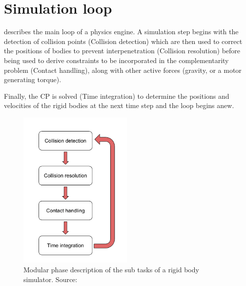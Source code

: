 \section{Simulation loop}
 describes the main loop of a physics engine. A simulation step begins with the detection of collision points (Collision detection) which are then used to correct the positions of bodies to prevent interpenetration (Collision resolution) before being used to derive constraints to be incorporated in the complementarity problem (Contact handling), along with other active forces (gravity, or a motor generating torque). 

Finally, the CP is solved (Time integration) to determine the positions and velocities of the rigid bodies at the next time step and the loop begins anew.

\begin{figure}[htp]
\centering
\includegraphics[width=0.5\textwidth]{figures/star_simul_loop2}
\caption[Modular phase description of the sub tasks of a rigid body simulator]{Modular phase description of the sub tasks of a rigid body simulator. Source: \cite{BETC2012}}
\label{fig:phase_simul}
\end{figure}